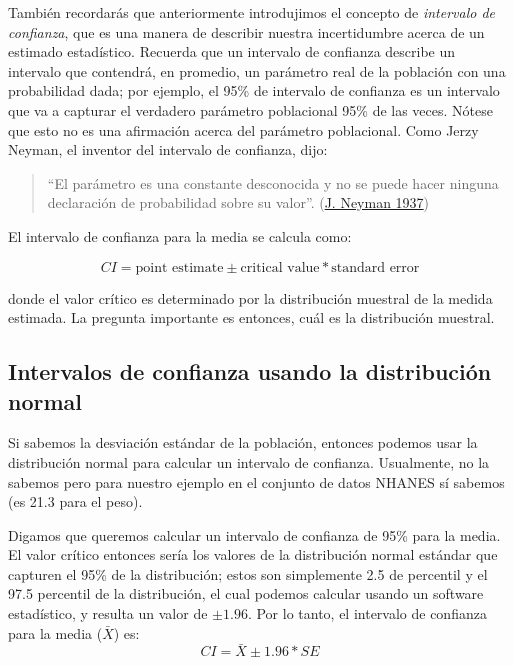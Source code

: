 \documentclass[
  12pt,
]{book}
\begin{document}
También recordarás que anteriormente introdujimos el concepto de \emph{intervalo de confianza}, que es una manera de describir nuestra incertidumbre acerca de un estimado estadístico. Recuerda que un intervalo de confianza describe un intervalo que contendrá, en promedio, un parámetro real de la población con una probabilidad dada; por ejemplo, el 95\% de intervalo de confianza es un intervalo que va a capturar el verdadero parámetro poblacional 95\% de las veces. Nótese que esto no es una afirmación acerca del parámetro poblacional. Como Jerzy Neyman, el inventor del intervalo de confianza, dijo:

\begin{quote}
``El parámetro es una constante desconocida y no se puede hacer ninguna declaración de probabilidad sobre su valor''. (\protect\hyperlink{ref-Neyman37}{J. Neyman 1937})
\end{quote}

El intervalo de confianza para la media se calcula como:

\[
CI = \text{point estimate} \pm \text{critical value} * \text{standard error}
\]

donde el valor crítico es determinado por la distribución muestral de la medida estimada. La pregunta importante es entonces, cuál es la distribución muestral.

\hypertarget{intervalos-de-confianza-usando-la-distribuciuxf3n-normal}{%
\subsection{Intervalos de confianza usando la distribución normal}\label{intervalos-de-confianza-usando-la-distribuciuxf3n-normal}}

Si sabemos la desviación estándar de la población, entonces podemos usar la distribución normal para calcular un intervalo de confianza. Usualmente, no la sabemos pero para nuestro ejemplo en el conjunto de datos NHANES sí sabemos (es 21.3 para el peso).

Digamos que queremos calcular un intervalo de confianza de 95\% para la media. El valor crítico entonces sería los valores de la distribución normal estándar que capturen el 95\% de la distribución; estos son simplemente 2.5 de percentil y el 97.5 percentil de la distribución, el cual podemos calcular usando un software estadístico, y resulta un valor de \(\pm 1.96\). Por lo tanto, el intervalo de confianza para la media (\(\bar{X}\)) es:
\[
CI = \bar{X} \pm 1.96*SE
\]
\end{document}
